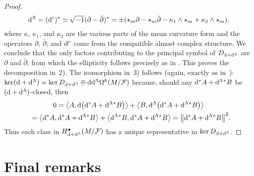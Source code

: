 \documentclass[10pt,a4paper]{amsart}
\numberwithin{equation}{section}
\begin{document}
\begin{proof}
\begin{gather*}
{\rm d}^{\Lambda}=({\rm d}^{c})^*\simeq \sqrt{-1}(\partial -\bar{\partial})^*=\pm(\star_m\partial - \star_{m}\bar{\partial} -\kappa_1\wedge \star_{m} + \kappa_2\wedge \star_{m}),
\end{gather*}
where $\kappa$, $\kappa_1$, and $\kappa_2$ are the various parts of the mean curvature form and the operators $\partial$, $\bar{\partial}$, and ${\rm d}^{c}$ come from the compatible almost complex structure. We conclude that the only factors contributing to the principal symbol of $D_{{\rm d}+{\rm d}^{\Lambda}}$ are $\partial$ and $\bar{\partial}$, from which the ellipticity follows precisely as in \cite[Theorem~3.5]{tseng}. This proves the decomposition in~2). The isomorphism in~3) follows (again, exactly as in~\cite{tseng}): $\ker ({\rm d}+{\rm d}^{\Lambda})=\ker D_{{\rm d}+{\rm d}^{\Lambda}}\oplus {\rm d}{\rm d}^{\Lambda}\Omega^k(M\slash\mathcal{F})$ because, should any ${\rm d}^*A+{\rm d}^{\Lambda}{}^*B$ be $({\rm d}+{\rm d}^{\Lambda})$-closed, then
\begin{gather*}
0=\big\langle A,{\rm d}\big({\rm d}^*A+{\rm d}^{\Lambda}{}^*B\big)\big\rangle+\big\langle B,{\rm d}^{\Lambda} \big({\rm d}^*A+{\rm d}^{\Lambda}{}^*B\big)\big\rangle \\
\hphantom{0}{} =\big\langle {\rm d}^*A,{\rm d}^*A+{\rm d}^{\Lambda}{}^*B\big\rangle+\big\langle {\rm d}^{\Lambda}{}^*B,{\rm d}^*A+{\rm d}^{\Lambda}{}^*B\big\rangle =\big\|{\rm d}^*A+{\rm d}^{\Lambda}{}^*B\big\|^2.
\end{gather*}
Thus each class in $H^{\bullet}_{{\rm d}+{\rm d}^{\Lambda}}(M\slash\mathcal{F})$ has a unique representative in $\ker D_{{\rm d}+{\rm d}^{\Lambda}}$.
\end{proof}


\section{Final remarks}
\end{document}
